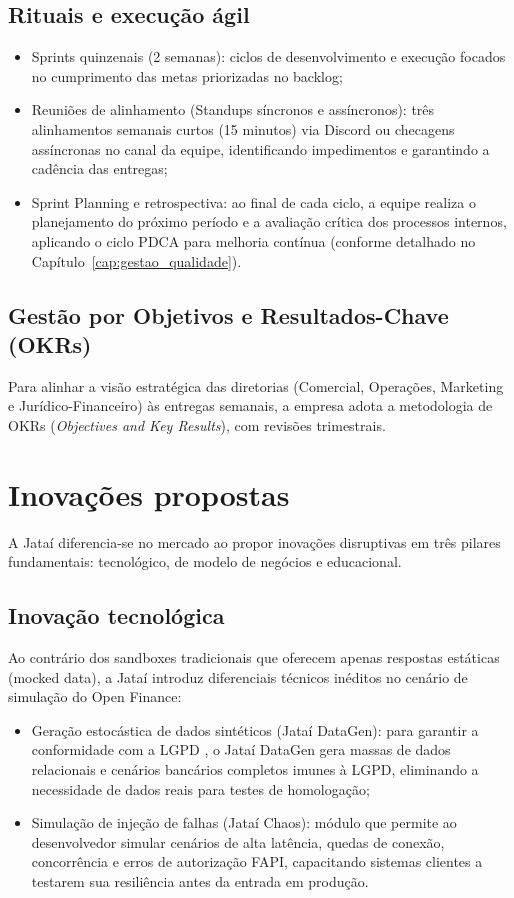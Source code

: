 \documentclass[
  12pt,
  openright,
  oneside,
  a4paper,
  brazilian
]{abntex2}
\begin{document}
\subsection{Rituais e execução ágil}
\begin{itemize}
    \item{Sprints quinzenais (2 semanas):} ciclos de desenvolvimento e execução focados no cumprimento das metas priorizadas no backlog;
    \item{Reuniões de alinhamento (Standups síncronos e assíncronos):} três alinhamentos semanais curtos (15 minutos) via Discord ou checagens assíncronas no canal da equipe, identificando impedimentos e garantindo a cadência das entregas;
    \item{Sprint Planning e retrospectiva:} ao final de cada ciclo, a equipe realiza o planejamento do próximo período e a avaliação crítica dos processos internos, aplicando o ciclo PDCA para melhoria contínua (conforme detalhado no Capítulo~\ref{cap:gestao_qualidade}).
\end{itemize}

\subsection{Gestão por Objetivos e Resultados-Chave (OKRs)}
Para alinhar a visão estratégica das diretorias (Comercial, Operações, Marketing e Jurídico-Financeiro) às entregas semanais, a empresa adota a metodologia de OKRs (\textit{Objectives and Key Results}), com revisões trimestrais.

\section{Inovações propostas}
\label{sec:inovacoes_propostas}

A Jataí diferencia-se no mercado ao propor inovações disruptivas em três pilares fundamentais: tecnológico, de modelo de negócios e educacional.

\subsection{Inovação tecnológica}
Ao contrário dos sandboxes tradicionais que oferecem apenas respostas estáticas (mocked data), a Jataí introduz diferenciais técnicos inéditos no cenário de simulação do Open Finance:
\begin{itemize}
    \item{Geração estocástica de dados sintéticos (Jataí DataGen):} para garantir a conformidade com a LGPD \cite{brasil2018lgpd}, o Jataí DataGen gera massas de dados relacionais e cenários bancários completos imunes à LGPD, eliminando a necessidade de dados reais para testes de homologação;
    \item{Simulação de injeção de falhas (Jataí Chaos):} módulo que permite ao desenvolvedor simular cenários de alta latência, quedas de conexão, concorrência e erros de autorização FAPI, capacitando sistemas clientes a testarem sua resiliência antes da entrada em produção.
\end{itemize}
\end{document}
